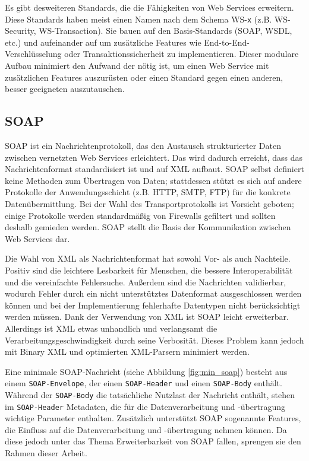 \documentclass[runningheads]{llncs}
\newcommand{\germanquote}[1]{\glqq{}#1\grqq{}}
\begin{document}
    Es gibt desweiteren Standards, die die Fähigkeiten von Web Services erweitern. Diese Standards
    haben meist einen Namen nach dem Schema \germanquote{WS-\texttt{x}} (z.B. WS-Security,
    WS-Transaction). Sie bauen auf den Basis-Standards (SOAP, WSDL, etc.) und aufeinander auf um
    zusätzliche Features wie End-to-End-Verschlüsselung oder Transaktionssicherheit zu
    implementieren. Dieser modulare Aufbau minimiert den Aufwand der nötig ist, um einen Web
    Service mit zusätzlichen Features auszurüsten oder einen Standard gegen einen anderen, besser
    geeigneten auszutauschen.

  \label{soap}
  \subsection{SOAP}
  \nocite{wfm_site}
  \nocite{wk_soap}
    SOAP ist ein Nachrichtenprotokoll, das den Austausch strukturierter Daten zwischen vernetzten
    Web Services erleichtert. Das wird dadurch erreicht, dass das Nachrichtenformat standardisiert
    ist und auf XML aufbaut. SOAP selbst definiert keine Methoden zum Übertragen von Daten;
    stattdessen stützt es sich auf andere Protokolle der Anwendungsschicht (z.B. HTTP, SMTP, FTP)
    für die konkrete Datenübermittlung. Bei der Wahl des Transportprotokolls ist Vorsicht geboten;
    einige Protokolle werden standardmäßig von Firewalls gefiltert und sollten deshalb gemieden
    werden. SOAP stellt die Basis der Kommunikation zwischen Web Services dar.

    Die Wahl von XML als Nachrichtenformat hat sowohl Vor- als auch Nachteile. Positiv sind die
    leichtere Lesbarkeit für Menschen, die bessere Interoperabilität und die vereinfachte
    Fehlersuche. Außerdem sind die Nachrichten validierbar, wodurch Fehler durch ein nicht
    unterstütztes Datenformat ausgeschlossen werden können und bei der Implementierung fehlerhafte
    Datentypen nicht berücksichtigt werden müssen. Dank der Verwendung von XML ist SOAP leicht
    erweiterbar. Allerdings ist XML etwas unhandlich und verlangsamt die
    Verarbeitungsgeschwindigkeit durch seine Verbosität. Dieses Problem kann jedoch mit Binary XML
    und optimierten XML-Parsern minimiert werden.

    Eine minimale SOAP-Nachricht (siehe Abbildung \ref{fig:min_soap}) besteht aus einem
    \texttt{SOAP-\linebreak[0]Envelope}, der einen \texttt{SOAP-\linebreak[0]Header} und einen
    \texttt{SOAP-\linebreak[0]Body} enthält. Während der \texttt{SOAP-\linebreak[0]Body} die
    tatsächliche Nutzlast der Nachricht enthält, stehen im \texttt{SOAP-\linebreak[0]Header}
    Metadaten, die für die Datenverarbeitung und -übertragung wichtige Parameter enthalten.
    Zusätzlich unterstützt SOAP sogenannte \germanquote{Features}, die Einfluss auf die
    Datenverarbeitung und -übertragung nehmen können. Da diese jedoch unter das Thema
    \germanquote{Erweiterbarkeit von SOAP} fallen, sprengen sie den Rahmen dieser Arbeit.
\end{document}
